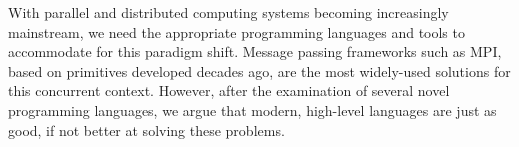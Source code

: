 




With parallel and distributed computing systems becoming increasingly mainstream, we need the appropriate programming languages and tools to accommodate for this paradigm shift. Message passing frameworks such as MPI, based on primitives developed decades ago, are the most widely-used solutions for this concurrent context. However, after the examination of several novel programming languages, we argue that modern, high-level languages are just as good, if not better at solving these problems.

